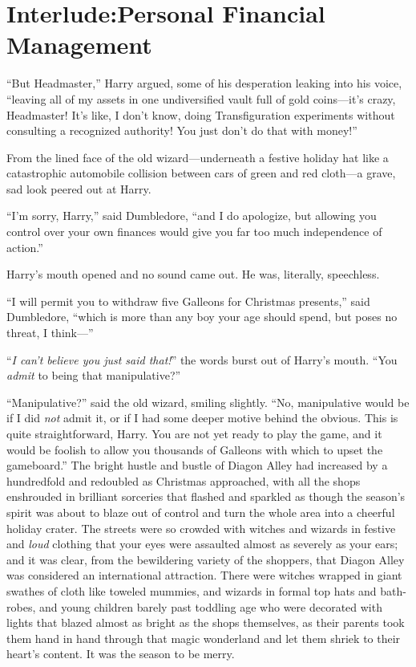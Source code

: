 \chapter[Interlude: Personal~Financial~Management]{Interlude:\protect\linebreak{}Personal Financial Management}

“But Headmaster,” Harry argued, some of his desperation leaking into his voice, “leaving all of my assets in one undiversified vault full of gold coins—it’s crazy, Headmaster! It’s like, I don’t know, doing Transfiguration experiments without consulting a recognized authority! You just don’t do that with money!”

From the lined face of the old wizard—underneath a festive holiday hat like a catastrophic automobile collision between cars of green and red cloth—a grave, sad look peered out at Harry.

“I’m sorry, Harry,” said Dumbledore, “and I do apologize, but allowing you control over your own finances would give you far too much independence of action.”

Harry’s mouth opened and no sound came out. He was, literally, speechless.

“I will permit you to withdraw five Galleons for Christmas presents,” said Dumbledore, “which is more than any boy your age should spend, but poses no threat, I think—”

“\emph{I can’t believe you just said that!}” the words burst out of Harry’s mouth. “You \emph{admit} to being that manipulative?”

“Manipulative?” said the old wizard, smiling slightly. “No, manipulative would be if I did \emph{not} admit it, or if I had some deeper motive behind the obvious. This is quite straightforward, Harry. You are not yet ready to play the game, and it would be foolish to allow you thousands of Galleons with which to upset the gameboard.”
\sbreak
The bright hustle and bustle of Diagon Alley had increased by a hundredfold and redoubled as Christmas approached, with all the shops enshrouded in brilliant sorceries that flashed and sparkled as though the season’s spirit was about to blaze out of control and turn the whole area into a cheerful holiday crater. The streets were so crowded with witches and wizards in festive and \emph{loud} clothing that your eyes were assaulted almost as severely as your ears; and it was clear, from the bewildering variety of the shoppers, that Diagon Alley was considered an international attraction. There were witches wrapped in giant swathes of cloth like toweled mummies, and wizards in formal top hats and bath-robes, and young children barely past toddling age who were decorated with lights that blazed almost as bright as the shops themselves, as their parents took them hand in hand through that magic wonderland and let them shriek to their heart’s content. It was the season to be merry.

